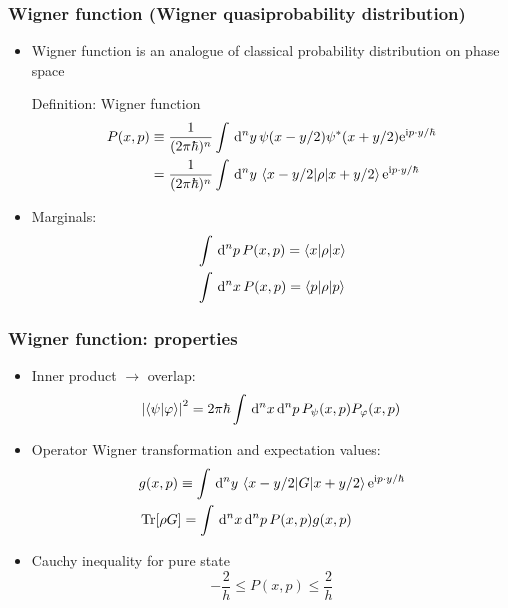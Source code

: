 \documentclass[xcolor=dvipsnames,hyperref={CJKbookmarks=true}]{beamer}
\newcommand{\dif}{\,\mathrm d}
\newcommand\mi{\mathrm{i}}
\newcommand\e{\mathrm{e}}
\DeclareMathOperator{\Tr}{Tr}
\begin{document}
\begin{frame}[t]\frametitle{Wigner function (Wigner quasiprobability distribution)}
\begin{itemize}
	\item Wigner function is an analogue of classical probability distribution 
	on phase space
	\begin{block}{Definition: Wigner function}
	\begin{align*}
		P(x, p) &\equiv \frac{1}{(2\pi\hbar)^n}\int\dif^n y \,
		    \psi(x-y/2)\psi^*(x+y/2) \e^{\mi p\cdot y/\hbar} \\
		&= \frac{1}{(2\pi\hbar)^n}\int\dif^n y\, 
			\braket{x-y/2|\rho|x+y/2} \e^{\mi p\cdot y/\hbar}
	\end{align*}
	\end{block}
	\item Marginals: 
	\begin{align*}
		&\int\dif^n p\, P(x,p) = \braket{x|\rho|x} \\
		&\int\dif^n x\, P(x,p) = \braket{p|\rho|p}
	\end{align*}
\end{itemize}
\end{frame}

\begin{frame}[t]\frametitle{Wigner function: properties}
\begin{itemize}
	\item Inner product $\rightarrow$ overlap: 
	$$
	  \left|\braket{\psi|\varphi}\right|^2 = 2\pi\hbar \int\dif^n x\dif^n p \,
	  P_\psi(x,p) P_\varphi(x,p)
	$$
	\item Operator Wigner transformation and expectation values: 
	\begin{align*}
		&g(x,p) \equiv \int\dif^n y \, \braket{x-y/2|G|x+y/2}
		\e^{\mi p\cdot y/\hbar} \\
		&\Tr [\rho G] = \int\dif^n x\dif^n p\, P(x,p)g(x,p)
	\end{align*}
	\item Cauchy inequality for pure state
	$$
	 -\frac 2h \le P(x,p) \le \frac 2h
	$$
\end{itemize}
\end{frame}
\end{document}
